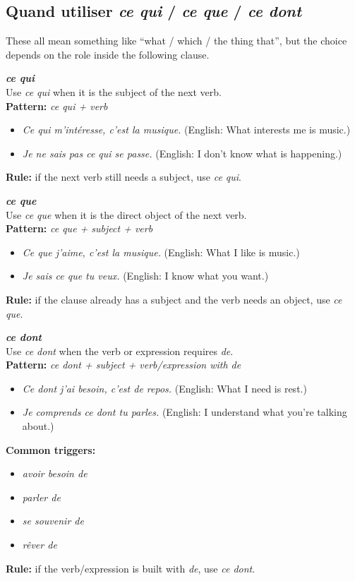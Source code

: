 \documentclass{article}
\begin{document}
\subsection{Quand utiliser \textit{ce qui} / \textit{ce que} / \textit{ce dont}}
These all mean something like ``what / which / the thing that'', but the choice depends on the role inside the following clause.

\textbf{\textit{ce qui}} \\
Use \textit{ce qui} when it is the subject of the next verb. \\
\textbf{Pattern:} \textit{ce qui + verb}
\begin{itemize}
    \item \textit{Ce qui m'intéresse, c'est la musique.} (English: What interests me is music.)
    \item \textit{Je ne sais pas ce qui se passe.} (English: I don't know what is happening.)
\end{itemize}
\textbf{Rule:} if the next verb still needs a subject, use \textit{ce qui}.

\textbf{\textit{ce que}} \\
Use \textit{ce que} when it is the direct object of the next verb. \\
\textbf{Pattern:} \textit{ce que + subject + verb}
\begin{itemize}
    \item \textit{Ce que j'aime, c'est la musique.} (English: What I like is music.)
    \item \textit{Je sais ce que tu veux.} (English: I know what you want.)
\end{itemize}
\textbf{Rule:} if the clause already has a subject and the verb needs an object, use \textit{ce que}.

\textbf{\textit{ce dont}} \\
Use \textit{ce dont} when the verb or expression requires \textit{de}. \\
\textbf{Pattern:} \textit{ce dont + subject + verb/expression with de}
\begin{itemize}
    \item \textit{Ce dont j'ai besoin, c'est de repos.} (English: What I need is rest.)
    \item \textit{Je comprends ce dont tu parles.} (English: I understand what you're talking about.)
\end{itemize}
\textbf{Common triggers:}
\begin{itemize}
    \item \textit{avoir besoin de}
    \item \textit{parler de}
    \item \textit{se souvenir de}
    \item \textit{rêver de}
\end{itemize}
\textbf{Rule:} if the verb/expression is built with \textit{de}, use \textit{ce dont}. \\
\end{document}
